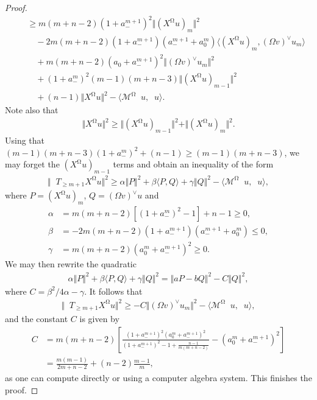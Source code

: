 \documentclass[12pt]{amsart}
\numberwithin{numbering}{section}
\theoremstyle{plain}
\theoremstyle{definition}
\theoremstyle{remark}
\numberwithin{equation}{section}
\DeclareMathOperator{\nv}{\nabla_{\mathbb{V}}}
\DeclareMathOperator{\mg}{\Omega}
\begin{document}
\begin{proof}
\begin{align*}
&\quad \geq m(m+n-2) (1 + a_-^{m+1})^2 \Vert (X^{\mg} u)_m \Vert^2 \\ 
&\quad \quad - 2 m(m+n-2) (1+a_-^{m+1})(a_-^{m+1} + a_0^m) \langle (X^{\mg} u)_m, (\Omega v)^\vee u_m \rangle \\ 
&\quad \quad + m(m+n-2) (a_0 + a_-^{m+1})^2 \Vert (\Omega v)^\vee u_m \Vert^2 \\ 
&\quad \quad + (1+a_-^m)^2 (m-1)(m+n-3) \Vert (X^{\mg} u)_{m-1} \Vert^2 \\ 
&\quad \quad + (n-1) \Vert X^{\mg} u \Vert^2 - \langle \mathcal{M}^{\mg} \nv u, \nv u \rangle.
\end{align*}
Note also that 
\begin{align*}
\Vert X^{\mg} u \Vert^2 \geq \Vert (X^{\mg} u)_{m-1} \Vert^2 + \Vert (X^{\mg} u)_m \Vert^2.
\end{align*}
Using that $(m-1)(m+n-3) (1+ a_-^m)^2 + (n-1 )\geq (m-1)(m+n-3)$, we may forget the $(X^{\mg} u)_{m-1}$ terms and obtain an inequality of the form
\begin{align*}
\Vert \nv T_{\geq m+1} X^{\mg} u \Vert^2 \geq \alpha \Vert P \Vert^2 + \beta \langle P, Q \rangle + \gamma \Vert Q \Vert^2 - \langle \mathcal{M}^{\mg} \nv u, \nv u \rangle,
\end{align*}
where $P = (X^{\mg} u)_m$, $Q = (\Omega v)^\vee u$ and 
\begin{align*}
\alpha &= m(m+n-2) [(1 + a_-^m)^2 -1] + n - 1 \geq 0, \\ 
\beta &= -2m(m+n-2)(1+a_-^{m+1})(a_-^{m+1} + a_0^m) \leq 0, \\ 
\gamma &= m(m+n-2) (a_0^m + a_-^{m+1})^2 \geq 0.
\end{align*}
We may then rewrite the quadratic 
\begin{align*}
\alpha \Vert P \Vert^2 + \beta \langle P, Q \rangle + \gamma \Vert Q \Vert^2 = \Vert a P - b Q \Vert^2 - C \Vert Q \Vert^2,
\end{align*}
where $C = \beta^2/4\alpha - \gamma$. It follows that 
\begin{align*}
\Vert \nv T_{\geq m+1} X^{\mg} u \Vert^2 \geq - C \Vert (\Omega v)^\vee u_m \Vert^2 - \langle \mathcal{M}^{\mg} \nv u, \nv u \rangle,
\end{align*}
and the constant $C$ is given by 
\begin{align*}
C &= m(m+n-2) \left [\frac{(1 + a_-^{m+1})^2(a_0^m + a_-^{m+1})^2}{(1 + a_-^{m+1})^2 - 1 + \frac{n-1}{m(m+n-2)}} - (a_0^m + a_-^{m+1})^2 \right ] \\ 
&= \frac{m(m-1)}{2m+n-2} + (n-2) \frac{m-1}{m},
\end{align*}
as one can compute directly or using a computer algebra system. This finishes the proof.
\end{proof}
\end{document}
